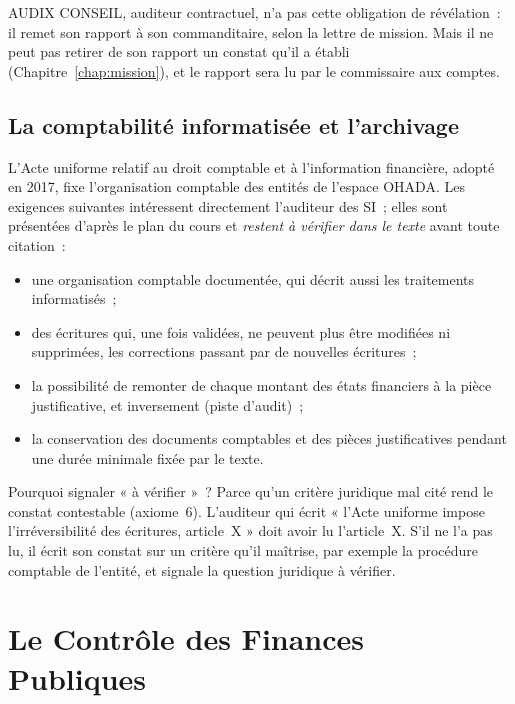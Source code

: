 AUDIX CONSEIL, auditeur contractuel, n'a pas cette obligation de
révélation~: il remet son rapport à son commanditaire, selon la lettre de
mission. Mais il ne peut pas retirer de son rapport un constat qu'il a
établi (Chapitre~\ref{chap:mission}), et le rapport sera lu par le
commissaire aux comptes.

\subsection{La comptabilité informatisée et l'archivage}

L'Acte uniforme relatif au droit comptable et à l'information financière,
adopté en 2017, fixe l'organisation comptable des entités de l'espace
OHADA. Les exigences suivantes intéressent directement l'auditeur des SI~;
elles sont présentées d'après le plan du cours et \emph{restent à vérifier
dans le texte} avant toute citation~:
\begin{itemize}
    \item une organisation comptable documentée, qui décrit aussi les
          traitements informatisés~;
    \item des écritures qui, une fois validées, ne peuvent plus être
          modifiées ni supprimées, les corrections passant par de nouvelles
          écritures~;
    \item la possibilité de remonter de chaque montant des états financiers
          à la pièce justificative, et inversement (piste d'audit)~;
    \item la conservation des documents comptables et des pièces
          justificatives pendant une durée minimale fixée par le texte.
\end{itemize}

\begin{boiteRemarque}{Pourquoi signaler « à vérifier »~?}
Parce qu'un critère juridique mal cité rend le constat contestable
(axiome~6). L'auditeur qui écrit « l'Acte uniforme impose
l'irréversibilité des écritures, article~X » doit avoir lu l'article~X.
S'il ne l'a pas lu, il écrit son constat sur un critère qu'il maîtrise,
par exemple la procédure comptable de l'entité, et signale la question
juridique à vérifier.
\end{boiteRemarque}

\section{Le Contrôle des Finances Publiques}
\label{sec:c12-public}

